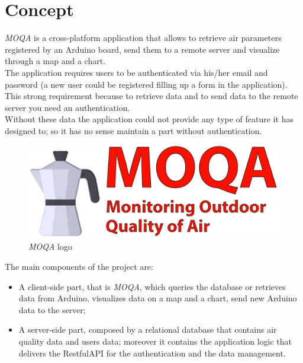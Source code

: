 \section{Concept}
\textit{MOQA} is a cross-platform application that allows to retrieve air parameters registered by an Arduino board, send them to a remote server and visualize through a map and a chart.\\

The application requires users to be authenticated via his/her email and password (a new user could be registered filling up a form in the application). This strong requirement because to retrieve data and to send data to the remote server you need an authentication. \\ 
Without these data the application could not provide any type of feature it has designed to; so it has no sense maintain a part without authentication.\\

\begin{figure}[h]
\begin{center}
  \includegraphics{img/logo_moqa.png}
  \hspace{0.05\linewidth}
  \centering
  \caption{\textit{MOQA} logo}
  \label{img:logo_moqa}
\end{center}
\end{figure}
\clearpage

The main components of the project are:
\begin{itemize}
    \item A client-side part, that is \textit{MOQA}, which queries the database or retrieves data from Arduino, visualizes data on a map and a chart, send new Arduino data to the server;
    \item A server-side part, composed by a relational database that contains air quality data and users data; moreover it contains the application logic that delivers the RestfulAPI for the authentication and the data management.
\end{itemize}


